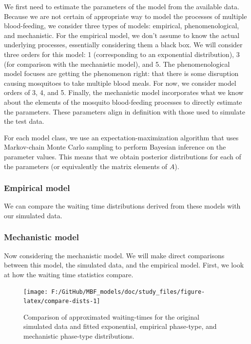 \documentclass[
]{article}
\begin{document}
We first need to estimate the parameters of the model from the available
data. Because we are not certain of appropriate way to model the
processes of multiple blood-feeding, we consider three types of models:
empirical, phenomenological, and mechanistic. For the empirical model,
we don't assume to know the actual underlying processes, essentially
considering them a black box. We will consider three orders for this
model: 1 (corresponding to an exponential distribution), 3 (for
comparison with the mechanistic model), and 5. The phenomenological
model focuses are getting the phenomenon right: that there is some
disruption causing mosquitoes to take multiple blood meals. For now, we
consider model orders of 3, 4, and 5. Finally, the mechanistic model
incorporates what we know about the elements of the mosquito
blood-feeding processes to directly estimate the parameters. These
parameters align in definition with those used to simulate the test
data.

For each model class, we use an expectation-maximization algorithm that
uses Markov-chain Monte Carlo sampling to perform Bayesian inference on
the parameter values. This means that we obtain posterior distributions
for each of the parameters (or equivalently the matrix elements of
\(A\)).

\subsubsection{Empirical model}\label{empirical-model}

We can compare the waiting time distributions derived from these models
with our simulated data.

\subsubsection{Mechanistic model}\label{mechanistic-model}

Now considering the mechanistic model. We will make direct comparisons
between this model, the simulated data, and the empirical model. First,
we look at how the waiting time statistics compare.

\begin{figure}[H]
\texttt{[image: F:/GitHub/MBF\_models/doc/study\_files/figure-latex/compare-dists-1]} \caption{Comparison of approximated waiting-times for the original simulated data and fitted exponential, empirical phase-type, and mechanistic phase-type distributions.}\label{fig:compare-dists}
\end{figure}
\end{document}
